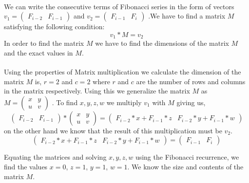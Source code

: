 \documentclass{article}
\begin{document}
\paragraph{}
We can write the consecutive terms of Fibonacci series in the form of vectors $v_1 = \begin{pmatrix}
  F_{i-2} &  F_{i-1}
\end{pmatrix}$
and
$v_2 = 
\begin{pmatrix}
  F_{i-1} &  F_{i}
\end{pmatrix}$ 
.We have to find a matrix $M$ satisfying the following condition:
$$
v_1 * M = v_2
$$
In order to find the matrix $M$ we have to find the dimensions of the matrix $M$ and the exact values in $M$.
\paragraph{}
Using the properties of Matrix multiplication we calculate the dimension of the matrix $M$ is, $r=2$ and $c=2$ where $r$ and $c$ are the number of rows and columns in the matrix respectively. Using this we generalize the matrix $M$ as $M = 
\begin{pmatrix}
  x&y \\
  u&v
\end{pmatrix}$
. To find $x, y, z, w$ we multiply $v_1$ with $M$ giving us,
$$
\begin{pmatrix}
  F_{i-2} &  F_{i-1}
\end{pmatrix}
*
\begin{pmatrix}
  x&y \\
  u&v
\end{pmatrix}
=
\begin{pmatrix}
  F_{i-2}*x+F_{i-1}*z & F_{i-2}*y+F_{i-1}*w
\end{pmatrix}
$$
on the other hand we know that the result of this multiplication must be $v_2$.
$$
\begin{pmatrix}
  F_{i-2}*x+F_{i-1}*z & F_{i-2}*y+F_{i-1}*w
\end{pmatrix}
=
\begin{pmatrix}
  F_{i-1} &  F_{i}
\end{pmatrix}
$$

Equating the matrices and solving $x,y,z,w$ using the Fibonacci recurrence, we find the values $x=0$, $z=1$, $y=1$, $w=1$. We know the size and contents of the matrix $M$.
\paragraph{}
\end{document}
